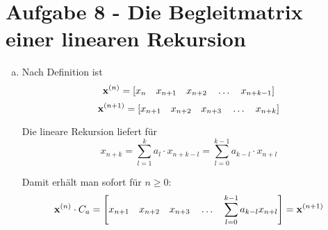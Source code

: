 \section*{Aufgabe 8 - Die Begleitmatrix einer linearen Rekursion}

\begin{enumerate}[(a)]

\item
	Nach Definition ist
	\[ {\bf x}^{(n)} = \left[ x_n \quad x_{n+1} \quad x_{n+2} \quad \ldots \quad x_{n+k-1} \right] \]
	\[ {\bf x}^{(n+1)} =  \left[ x_{n+1} \quad x_{n+2} \quad x_{n+3} \quad \ldots \quad x_{n+k} \right] \]

	Die lineare Rekursion liefert für 
	\[ x_{n+k} = \sum_{l = 1}^{k} a_l \cdot x_{n+k-l} = \sum_{l=0}^{k-1} a_{k-l} \cdot x_{n+l} \]

	Damit erhält man sofort für $n \geq 0$:
	\[ {\bf x}^{(n)} \cdot C_a = \left[  x_{n+1} \quad x_{n+2} \quad x_{n+3} \quad \ldots \quad \sum_{l=0}^{k-1} a_{k-l} x_{n+l} \right] = {\bf x}^{(n+1)} \]


\end{enumerate}
